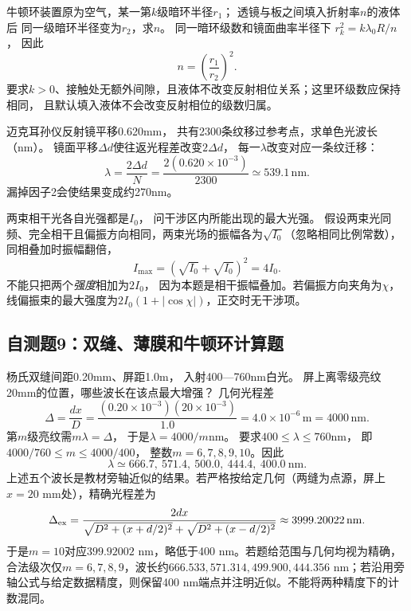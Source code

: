 \problemtext 牛顿环装置原为空气，某一第$k$级暗环半径$r_1$；
透镜与板之间填入折射率$n$的液体后
同一级暗环半径变为$r_2$，求$n$。
\workings
同一暗环级数和镜面曲率半径下
$r_k^2=k\lambda_0R/n$，
因此
\[
\boxed{n=\left(\frac{r_1}{r_2}\right)^2}.
\]
\crosscheck 要求$k>0$、接触处无额外间隙，且液体不改变反射相位关系；这里环级数应保持相同，
且默认填入液体不会改变反射相位的级数归属。

\problemtext 迈克耳孙仪反射镜平移0.620mm，
共有2300条纹移过参考点，求单色光波长（nm）。
\workings
镜面平移$\Delta d$使往返光程差改变$2\Delta d$，
每一$\lambda$改变对应一条纹迁移：
\[
\boxed{\lambda=\frac{2\Delta d}{N}
=\frac{2(0.620\times10^{-3})}{2300}
\simeq539.1\,\mathrm{nm}}.
\]
\crosscheck 漏掉因子2会使结果变成约270nm。

\problemtext 两束相干光各自光强都是$I_0$，
问干涉区内所能出现的最大光强。
\workings
假设两束光同频、完全相干且偏振方向相同，两束光场的振幅各为$\sqrt{I_0}$（忽略相同比例常数），
同相叠加时振幅翻倍，
\[
\boxed{I_{\max}=(\sqrt{I_0}+\sqrt{I_0})^2=4I_0}.
\]
\crosscheck 不能只把两个\emph{强度}相加为$2I_0$，
因为本题是相干振幅叠加。若偏振方向夹角为$\chi$，线偏振束的最大强度为$2I_0(1+|\cos\chi|)$，正交时无干涉项。

\subsection{自测题9：双缝、薄膜和牛顿环计算题}

\problemtext 杨氏双缝间距0.20mm、屏距1.0m，
入射400—760nm白光。
屏上离零级亮纹20mm的位置，哪些波长在该点最大增强？
\workings
几何光程差
\[
\Delta=\frac{dx}{D}
=\frac{(0.20\times10^{-3})(20\times10^{-3})}{1.0}
=4.0\times10^{-6}\,\mathrm m=4000\,\mathrm{nm}.
\]
第$m$级亮纹需$m\lambda=\Delta$，
于是$\lambda=4000/m$nm。
要求$400\le\lambda\le760$nm，
即$4000/760\le m\le4000/400$，
整数$m=6,7,8,9,10$。因此
\[
\boxed{\lambda\simeq666.7,\ 571.4,\ 500.0,\ 444.4,\ 400.0\ \mathrm{nm}}.
\]
\crosscheck 上述五个波长是教材旁轴近似的结果。若严格按给定几何（两缝为点源，屏上$x=20$ mm处），精确光程差为
\[
\Delta_{\rm ex}=\frac{2dx}{\sqrt{D^2+(x+d/2)^2}+\sqrt{D^2+(x-d/2)^2}}\approx3999.20022\,\mathrm{nm}.
\]
于是$m=10$对应$399.92002$ nm，略低于400 nm。若题给范围与几何均视为精确，合法级次仅$m=6,7,8,9$，波长约$666.533,571.314,499.900,444.356$ nm；若沿用旁轴公式与给定数据精度，则保留400 nm端点并注明近似。不能将两种精度下的计数混同。

